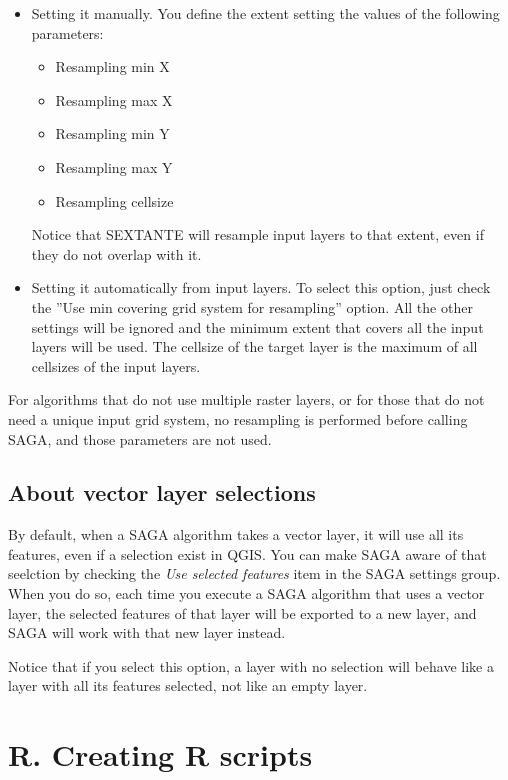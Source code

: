 \begin{itemize}
	\item{Setting it manually}. You define the extent setting the values of the following parameters:
	\begin{itemize}
		\item Resampling min X
		\item Resampling max X
		\item Resampling min Y
		\item Resampling max Y
		\item Resampling cellsize
	\end{itemize}
	Notice that SEXTANTE will resample input layers to that extent, even if they do not overlap with it.
	\item Setting it automatically from input layers. To select this option, just check the ''Use min covering grid system for resampling'' option. All the other settings will be ignored and the minimum extent that covers all the input layers will be used. The cellsize of the target layer is the maximum of all cellsizes of the input layers.
\end{itemize}

For algorithms that do not use multiple raster layers, or for those that do not need a unique input grid system, no resampling is performed before calling SAGA, and those parameters are not used.

\subsection{About vector layer selections}

By default, when a SAGA algorithm takes a vector layer, it will use all its features, even if a selection exist in QGIS. You can make SAGA aware of that seelction by checking the \emph{Use selected features} item in the SAGA settings group. When you do so, each time you execute a SAGA algorithm that uses a vector layer, the selected features of that layer will be exported to a new layer, and SAGA will work with that new layer instead.

Notice that if you select this option, a layer with no selection will behave like a layer with all its features selected, not like an empty layer.

\section{R. Creating R scripts}\label{rscripts}

